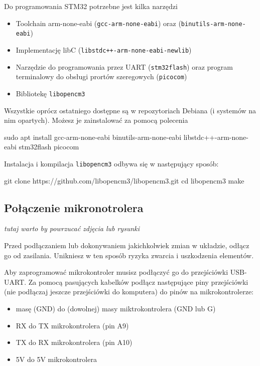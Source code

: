 \documentclass{pdfBooklets}
\begin{document}
Do programowania STM32 potrzebne jest kilka narzędzi

\begin{itemize}
  \item Toolchain arm-none-eabi (\Verb$gcc-arm-none-eabi$) oraz (\Verb$binutils-arm-none-eabi$)
  \item Implementację libC (\Verb$libstdc++-arm-none-eabi-newlib$)
  \item Narzędzie do programowania przez UART (\Verb$stm32flash$) oraz program terminalowy do obsługi prortów szeregowych (\Verb$picocom$)
  \item Bibliotekę \Verb$libopencm3$
\end{itemize}
Wszystkie oprócz ostatniego dostępne są w repozytoriach Debiana (i systemów na nim opartych). Możesz je zainstalować
za pomocą polecenia

\begin{CodeFrame*}[bash]{}
sudo apt install gcc-arm-none-eabi binutils-arm-none-eabi libstdc++-arm-none-eabi stm32flash picocom
\end{CodeFrame*}

Instalacja i kompilacja \Verb$libopencm3$ odbywa się w następujący sposób:

\begin{CodeFrame*}[bash]{}
git clone https://github.com/libopencm3/libopencm3.git
cd libopencm3
make
\end{CodeFrame*}

\subsection{Połączenie mikronotrolera}
\textit {tutaj warto by powrzucać zdjęcia lub rysunki}

\begin{ProTip}{}
  Przed podłączaniem lub dokonywaniem jakichkolwiek zmian w układzie, odłącz go od zasilania. Unikniesz
  w ten sposób ryzyka zwarcia i uszkodzenia elementów.
\end{ProTip}

Aby zaprogramować mikrokontroler musisz podłączyć go do przejściówki USB-UART.
Za pomocą pasujących kabelków podłącz następujące piny przejściówki (nie podłączaj jeszcze
przejściówki do komputera) do pinów na mikrokontrolerze:
\begin{itemize}
\item masę (GND) do (dowolnej) masy miktrokontrolera (GND lub G)
\item RX do TX mikrokontrolera (pin A9)
\item TX do RX mikrokontrolera (pin A10)
\item 5V do 5V mikrokontrolera
\end{itemize}
\end{document}
